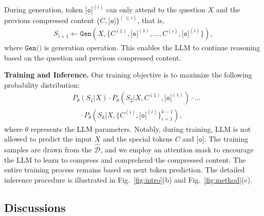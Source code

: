 During generation, token $\texttt{[o]}^{(i)}$ can only attend to the question $X$ and the previous compressed content $\{C, \texttt{[o]}\}^{(\le i)}$, that is, 
\begin{align*}
S_{i+1}\leftarrow \texttt{Gen}(X,\{C^{(1)}, \texttt{[o]}^{(1)},\dots,C^{(i)},\texttt{[o]}^{(i)}\}),
\end{align*}
where $\texttt{Gen()}$ is generation operation.
This enables the LLM to continue reasoning based on the question and previous compressed content.

\textbf{Training and Inference.}
Our training objective is to maximize the following probability distribution:
\begin{align*}
&P_\theta(S_1|X) \cdot P_\theta (S_2|X,C^{(1)},\texttt{[o]}^{(1)})\cdot \dots \\
&\quad\cdot P_\theta ( S_k|X, \{ C^{(i)},\texttt{[o]}^{(i)} \}_{i=1}^{k-1}  ),
\end{align*}
where $\theta$ represents the LLM parameters.
Notably, during training, LLM is not allowed to predict the input $X$ and the special tokens $C$ and $\texttt{[o]}$.
The training samples are drawn from the $\mathcal{\hat{D}}$, and we employ an attention mask to encourage the LLM to learn to compress and comprehend the compressed content. 
The entire training process remains based on next token prediction. 
The detailed inference procedure is illustrated in Fig.~\ref{fig:intro}(b) and Fig.~\ref{fig:method}(c). 

\subsection{Discussions}
\label{sec:method:discussion}

